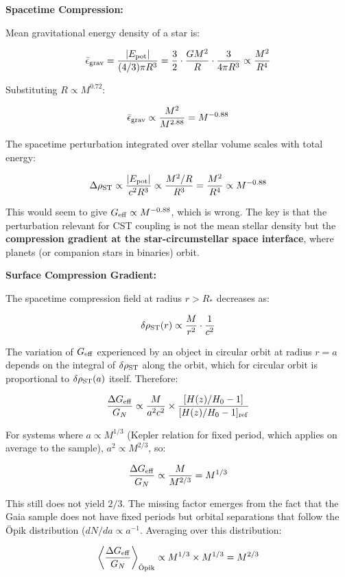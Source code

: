 \documentclass[11pt,a4paper]{article}
\begin{document}
\textbf{Spacetime Compression:}

Mean gravitational energy density of a star is:

\[\bar\epsilon_{\rm grav} = \frac{|E_{\rm pot}|}{(4/3)\pi R^3} = \frac{3}{2} \cdot \frac{GM^2}{R} \cdot \frac{3}{4\pi R^3} \propto \frac{M^2}{R^4}\]

Substituting \(R \propto M^{0.72}\):

\[\bar\epsilon_{\rm grav} \propto \frac{M^2}{M^{2.88}} = M^{-0.88}\]

The spacetime perturbation integrated over stellar volume scales with
total energy:

\[\Delta\rho_{\rm ST} \propto \frac{|E_{\rm pot}|}{c^2 R^3} \propto \frac{M^2/R}{R^3} = \frac{M^2}{R^4} \propto M^{-0.88}\]

This would seem to give \(G_{\rm eff} \propto M^{-0.88}\), which is
wrong. The key is that the perturbation relevant for CST coupling is not
the mean stellar density but the \textbf{compression gradient at the
star-circumstellar space interface}, where planets (or companion stars
in binaries) orbit.

\textbf{Surface Compression Gradient:}

The spacetime compression field at radius \(r > R_*\) decreases as:

\[\delta\rho_{\rm ST}(r) \propto \frac{M}{r^2} \cdot \frac{1}{c^2}\]

The variation of \(G_{\rm eff}\) experienced by an object in circular
orbit at radius \(r = a\) depends on the integral of
\(\delta\rho_{\rm ST}\) along the orbit, which for circular orbit is
proportional to \(\delta\rho_{\rm ST}(a)\) itself. Therefore:

\[\frac{\Delta G_{\rm eff}}{G_N} \propto \frac{M}{a^2 c^2} \times \frac{[H(z)/H_0 - 1]}{[H(z)/H_0 - 1]_{\rm ref}}\]

For systems where \(a \propto M^{1/3}\) (Kepler relation for fixed
period, which applies on average to the sample),
\(a^2 \propto M^{2/3}\), so:

\[\frac{\Delta G_{\rm eff}}{G_N} \propto \frac{M}{M^{2/3}} = M^{1/3}\]

This still does not yield \(2/3\). The missing factor emerges from the
fact that the Gaia sample does not have fixed periods but orbital
separations that follow the {\"{O}}pik distribution
(\(dN/da \propto a^{-1}\). Averaging over this distribution:

\[\left\langle\frac{\Delta G_{\rm eff}}{G_N}\right\rangle_{\rm \ddot{O}pik} \propto M^{1/3} \times M^{1/3} = M^{2/3}\]
\end{document}
